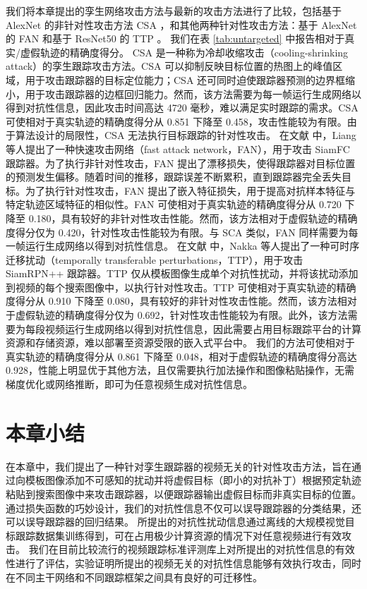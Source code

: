 我们将本章提出的孪生网络攻击方法与最新的攻击方法进行了比较，包括基于 AlexNet 的非针对性攻击方法 CSA \cite{CSA}，和其他两种针对性攻击方法：基于 AlexNet 的 FAN \cite{FAN} 和基于 ResNet50 的 TTP \cite{TTP}。
我们在表 \ref{tab:untargeted} 中报告相对于真实/虚假轨迹的精确度得分。
CSA \cite{CSA} 是一种称为冷却收缩攻击（cooling-shrinking attack）的孪生跟踪攻击方法。CSA 可以抑制反映目标位置的热图上的峰值区域，用于攻击跟踪器的目标定位能力；CSA 还可同时迫使跟踪器预测的边界框缩小，用于攻击跟踪器的边框回归能力。然而，该方法需要为每一帧运行生成网络以得到对抗性信息，因此攻击时间高达 4720 毫秒，难以满足实时跟踪的需求。CSA 可使相对于真实轨迹的精确度得分从 0.851 下降至 0.458，攻击性能较为有限。由于算法设计的局限性，CSA 无法执行目标跟踪的针对性攻击。
在文献 \cite{FAN} 中，Liang 等人提出了一种快速攻击网络（fast attack network，FAN），用于攻击 SiamFC 跟踪器。为了执行非针对性攻击，FAN 提出了漂移损失，使得跟踪器对目标位置的预测发生偏移。随着时间的推移，跟踪误差不断累积，直到跟踪器完全丢失目标。为了执行针对性攻击，FAN 提出了嵌入特征损失，用于提高对抗样本特征与特定轨迹区域特征的相似性。FAN 可使相对于真实轨迹的精确度得分从 0.720 下降至 0.180，具有较好的非针对性攻击性能。然而，该方法相对于虚假轨迹的精确度得分仅为 0.420，针对性攻击性能较为有限。与 SCA 类似，FAN 同样需要为每一帧运行生成网络以得到对抗性信息。
在文献 \cite{TTP} 中，Nakka 等人提出了一种可时序迁移扰动（temporally transferable perturbations，TTP），用于攻击 SiamRPN++ 跟踪器。TTP 仅从模板图像生成单个对抗性扰动，并将该扰动添加到视频的每个搜索图像中，以执行针对性攻击。TTP 可使相对于真实轨迹的精确度得分从 0.910 下降至 0.080，具有较好的非针对性攻击性能。然而，该方法相对于虚假轨迹的精确度得分仅为 0.692，针对性攻击性能较为有限。此外，该方法需要为每段视频运行生成网络以得到对抗性信息，因此需要占用目标跟踪平台的计算资源和存储资源，难以部署至资源受限的嵌入式平台中。
我们的方法可使相对于真实轨迹的精确度得分从 0.861 下降至 0.048，相对于虚假轨迹的精确度得分高达 0.928，性能上明显优于其他方法，且仅需要执行加法操作和图像粘贴操作，无需梯度优化或网络推断，即可为任意视频生成对抗性信息。

\section{本章小结}

在本章中，我们提出了一种针对孪生跟踪器的视频无关的针对性攻击方法，旨在通过向模板图像添加不可感知的扰动并将虚假目标（即小的对抗补丁）根据预定轨迹粘贴到搜索图像中来攻击跟踪器，以便跟踪器输出虚假目标而非真实目标的位置。
通过损失函数的巧妙设计，我们的对抗性信息不仅可以误导跟踪器的分类结果，还可以误导跟踪器的回归结果。
所提出的对抗性扰动信息通过离线的大规模视觉目标跟踪数据集训练得到，可在占用极少计算资源的情况下对任意视频进行有效攻击。
我们在目前比较流行的视频跟踪标准评测库上对所提出的对抗性信息的有效性进行了评估，实验证明所提出的视频无关的对抗性信息能够有效执行攻击，同时在不同主干网络和不同跟踪框架之间具有良好的可迁移性。